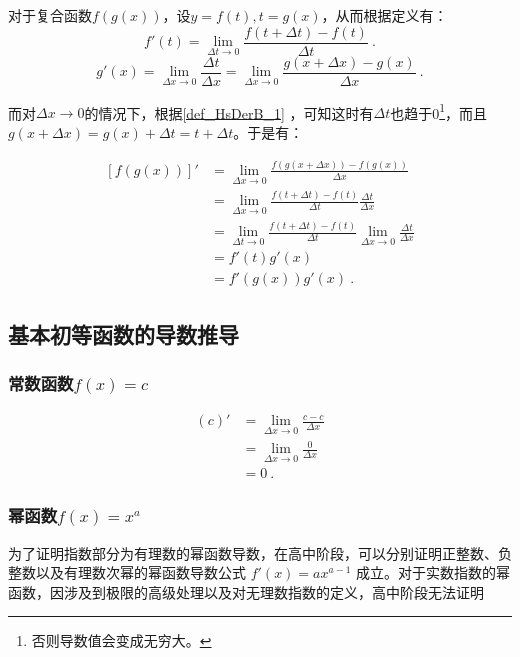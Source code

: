 对于复合函数$f\left(g(x)\right)$，设$y=f(t),t=g(x)$，从而根据定义有：
\begin{equation}
f'(t)=\lim_{\Delta t\to 0}\frac{f(t+\Delta t)-f(t)}{\Delta t}~.
\end{equation}
\begin{equation}
g'(x)=\lim_{\Delta x\to 0}\frac{\Delta t}{\Delta x}=\lim_{\Delta x\to 0}\frac{g(x+\Delta x)-g(x)}{\Delta x}~.
\end{equation}

而对$\Delta x\to 0$的情况下，根据\autoref{def_HsDerB_1} ，可知这时有$\Delta t$也趋于0\footnote{否则导数值会变成无穷大。}，而且$g(x+\Delta x)=g(x)+\Delta t=t+\Delta t$。于是有：

\begin{equation}
\begin{split}
\left[f(g(x))\right]'&=\lim_{\Delta x\to 0}\frac{f(g(x+\Delta x))-f(g(x))}{\Delta x}\\
&=\lim_{\Delta x\to 0}\frac{f(t+\Delta t)-f(t)}{\Delta t}\frac{\Delta t}{\Delta x}\\
&=\lim_{\Delta t\to 0}\frac{f(t+\Delta t)-f(t)}{\Delta t}\lim_{\Delta x\to 0}\frac{\Delta t}{\Delta x}\\
&=f'(t) g'(x)\\
&=f'(g(x)) g'(x)~.
\end{split}
\end{equation}
\subsection{基本初等函数的导数推导}

\subsubsection{常数函数$f(x)=c$}

\begin{equation}
\begin{split}
(c)'&=\lim_{\Delta x\to 0}\frac{c-c}{\Delta x}\\
&=\lim_{\Delta x\to 0}\frac{0}{\Delta x}\\
&=0~.
\end{split}
\end{equation}

\subsubsection{幂函数$f(x)=x^a$}

为了证明指数部分为有理数的幂函数导数，在高中阶段，可以分别证明正整数、负整数以及有理数次幂的幂函数导数公式 $f'(x) = ax^{a-1}$ 成立。对于实数指数的幂函数，因涉及到极限的高级处理以及对无理数指数的定义，高中阶段无法证明

